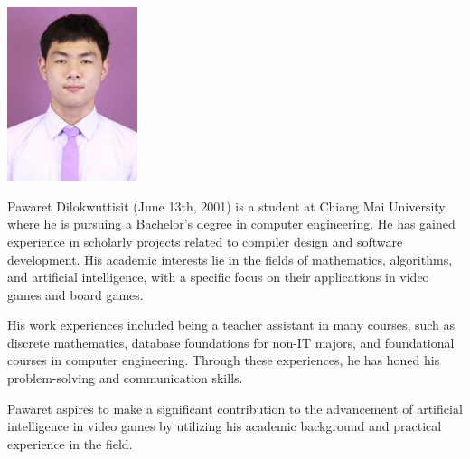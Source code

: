 \documentclass[final, project, english, glossary]{cpecmu}
\author{นายบางกอก วาณิชยานนท์}{Baangkok Vanijyananda}{630610746}
\author{นายปวเรศ ดิลกวุฒิสิทธิ์}{Pawaret Dilokwuttisit}{630610748}
\begin{document}
\ifglossary
  
\fi





\pagestyle{empty}\cleardoublepage
\normalspacing \setcounter{page}{1}  \pagestyle{cpecmu}





\ifproject

\fi



\ifproject
\normalspacing
% 

\ifglossary\glossarypage\fi

\ifindex\indexpage\fi


\begin{biosketch}
\begin{center}
  \includegraphics[width=1.5in]{images/pawaret-mugshot.jpg}
\end{center}
Pawaret Dilokwuttisit (June 13th, 2001) is a student at Chiang Mai University, where he is pursuing a Bachelor's degree in computer engineering. He has gained experience in scholarly projects related to compiler design and software development. His academic interests lie in the fields of mathematics, algorithms, and artificial intelligence, with a specific focus on their applications in video games and board games.

His work experiences included being a teacher assistant in many courses, such as discrete mathematics, database foundations for non-IT majors, and foundational courses in computer engineering. Through these experiences, he has honed his problem-solving and communication skills.

Pawaret aspires to make a significant contribution to the advancement of artificial intelligence in video games by utilizing his academic background and practical experience in the field.

\end{biosketch}
\end{document}
